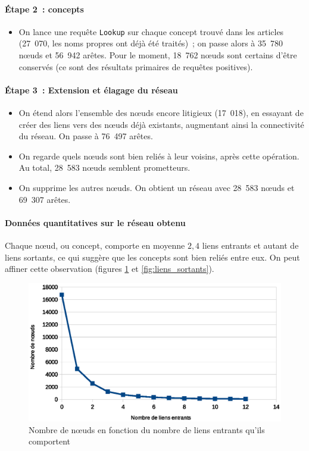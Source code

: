 \documentclass[a4paper, 12pt]{article}
\begin{document}
\paragraph{Étape 2~: concepts}

\begin{itemize}
 \item On lance une requête \texttt{Lookup} sur chaque concept trouvé dans les articles (27~070, les noms propres ont déjà été traités)~; on passe alors à 35~780 n\oe{}uds et 56~942 arêtes. Pour le moment, 18~762 n\oe{}uds sont certains d'être conservés (ce sont des résultats primaires de requêtes positives).
\end{itemize}


\paragraph{Étape 3~: Extension et élagage du réseau}

\begin{itemize}
 \item On étend alors l'ensemble des n\oe{}uds encore litigieux (17~018), en essayant de créer des liens vers des n\oe{}uds déjà existants, augmentant ainsi la connectivité du réseau. On passe à 76~497 arêtes.
 \item On regarde quels n\oe{}uds sont bien reliés à leur voisins, après cette opération. Au total, 28~583 n\oe{}uds semblent prometteurs.
 \item On supprime les autres n\oe{}uds. On obtient un réseau avec 28~583 n\oe{}uds et 69~307 arêtes.
\end{itemize}


\paragraph{Données quantitatives sur le réseau obtenu}

Chaque n\oe{}ud, ou concept, comporte en moyenne $2,4$ liens entrants et autant de liens sortants, ce qui suggère que les concepts sont bien reliés entre eux. On peut affiner cette observation (figures \ref{fig:liens_entrants} et \ref{fig:liens_sortants}).

\begin{figure}[h]
 \centering
 \includegraphics[width=12cm]{./liens_entrants.eps}
 \caption{Nombre de n\oe{}uds en fonction du nombre de liens entrants qu'ils comportent}
 \label{fig:liens_entrants}
\end{figure}
\end{document}
